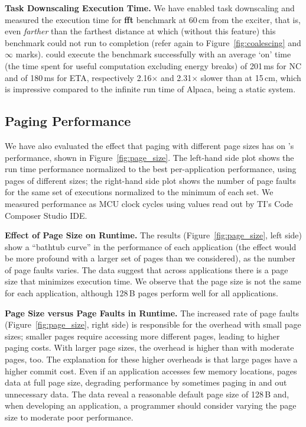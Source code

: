\textbf{Task Downscaling Execution Time.} We have enabled task downscaling and measured the execution time for \textbf{fft} benchmark at 60\,cm from the exciter, that is, even \emph{farther} than the farthest distance at which (without this feature) this benchmark could not run to completion (refer again to Figure~\ref{fig:coalescing} and $\infty$ marks). \sys could execute the benchmark successfully with an average `on' time (the time spent for useful computation excluding energy breaks) of 201\,ms for NC and of 180\,ms for ETA, respectively 2.16$\times$ and 2.31$\times$ slower than at 15\,cm, which is impressive compared to the infinite run time of Alpaca, being a static system.

\subsection{Paging Performance}
\label{sec:results_memory_management}

We have also evaluated the effect that paging with different page sizes has on \sys's performance, shown in Figure~\ref{fig:page_size}. The left-hand side plot shows the run time performance normalized to the best per-application performance, using pages of different sizes; the right-hand side plot shows the number of page faults for the same set of executions normalized to the minimum of each set. We measured performance as MCU clock cycles using values read out by TI's Code Composer Studio IDE. 

\textbf{Effect of Page Size on \sys Runtime.} The results (Figure~\ref{fig:page_size}, left side) show a ``bathtub curve'' in the performance of each application (the effect would be more profound with a larger set of pages than we considered), as the number of page faults varies. The data suggest that across applications there is a page size that minimizes execution time. We observe that the page size is not the same for each application, although 128\,B pages perform well for all applications. 

\textbf{Page Size versus Page Faults in \sys Runtime.} The increased rate of page faults (Figure~\ref{fig:page_size}, right side) is responsible for the overhead with small page sizes; smaller pages require accessing more different pages, leading to higher paging costs. With larger page sizes, the overhead is higher than with moderate pages, too. The explanation for these higher overheads is that large pages have a higher commit cost. Even if an application accesses few memory locations, \sys pages data at full page size, degrading performance by sometimes paging in and out unnecessary data. The data reveal a reasonable default page size of 128\,B and, when developing an application, a programmer should consider varying the page size to moderate poor performance.

